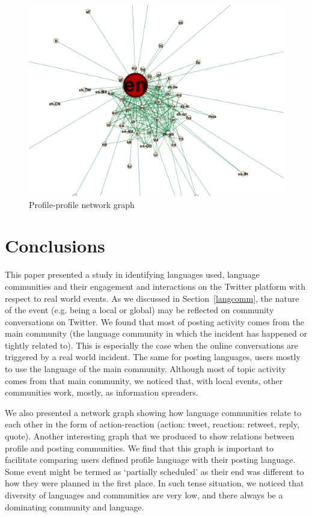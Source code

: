 \documentclass[conference]{IEEEtran}
\begin{document}
\begin{figure}[!h]
\centering
\includegraphics[width=\textwidth]{images/profileprofilegraph.png}
\caption{Profile-profile network graph}
\label{fig:profileprofilegraph}
\end{figure}


\section{Conclusions}\label{conclusions}

This paper presented a study in identifying languages used, language
communities and their engagement and interactions on the Twitter
platform with respect to real world events. As we discussed in
Section~\ref{langcomm}, the nature of the event (e.g. being a local or
global) may be reflected on community conversations on Twitter. We
found that most of posting activity comes from the main community (the
language community in which the incident has happened or tightly
related to). This is especially the case when the online conversations
are triggered by a real world incident. The same for posting
languages, users mostly to use the language of the main
community. Although most of topic activity comes from that main
community, we noticed that, with local events, other communities work,
mostly, as information spreaders.

We also presented a network graph showing how language communities
relate to each other in the form of action-reaction (action: tweet,
reaction: retweet, reply, quote). Another interesting graph that we
produced to show relations between profile and posting communities. We
find that this graph is important to facilitate comparing users
defined profile language with their posting language. Some event might
be termed as `partially scheduled' as their end was different to how
they were planned in the first place. In such tense situation, we
noticed that diversity of languages and communities are very low, and
there always be a dominating community and language.
\end{document}
